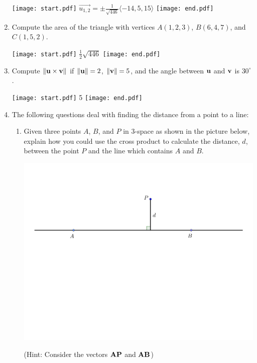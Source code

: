 \documentclass[12pt]{article}
\begin{document}
\begin{enumerate}
\texttt{[image: start.pdf]}
{{$\overrightarrow{u_{1,2}}=\pm\frac{1}{\sqrt{446}}\langle -14,5,15 \rangle$}}
\texttt{[image: end.pdf]}


\item Compute the area of the triangle with vertices $A(1,2,3)$, $B(6,4,7)$, and $C(1,5,2)$.

\texttt{[image: start.pdf]}
{{$\frac{1}{2}\sqrt{446}$}}
\texttt{[image: end.pdf]}


\item Compute $\|{\bf u} \times {\bf v}\|$ if $\|{\bf u}\|=2$, $\|{\bf v}\|=5$, and the angle between ${\bf u}$ and ${\bf v}$ is $30^{\circ}$.

\texttt{[image: start.pdf]}
{{5}}
\texttt{[image: end.pdf]}


\item The following questions deal with finding the distance from a point to a line:

\begin{enumerate}

\item Given three points $A$, $B$, and $P$ in 3-space as shown in the picture below, explain how you could use the cross product to calculate the distance, $d$, between the point $P$ and the line which contains $A$ and $B$.  

\begin{center}
\includegraphics[scale=0.5]{length.pdf}
\end{center}

(Hint: Consider the vectors ${\bf AP}$ and ${\bf AB}$)


\end{enumerate}
\end{enumerate}
\end{document}
